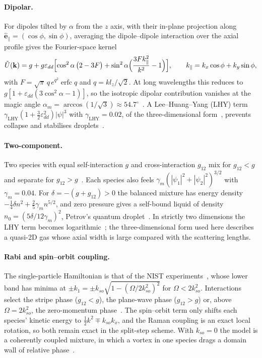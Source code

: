 \documentclass[11pt,a4paper]{article}
\begin{document}
\paragraph{Dipolar.} For dipoles tilted by $\alpha$ from the $z$ axis, with their in-plane projection along $\hat{\mathbf e}_\parallel=(\cos\phi,\sin\phi)$, averaging the dipole--dipole interaction over the axial profile gives the Fourier-space kernel~\cite{fischer,ticknor}
\begin{equation}
\tilde U(\mathbf k) = g + g\varepsilon_{dd}\Bigl[\cos^2\alpha\,\bigl(2-3F\bigr) + \sin^2\alpha\Bigl(\frac{3Fk_\parallel^2}{k^2}-1\Bigr)\Bigr],\qquad k_\parallel=k_x\cos\phi+k_y\sin\phi,
\end{equation}
with $F=\sqrt\pi\,q\,e^{q^2}\operatorname{erfc}q$ and $q=kl_z/\sqrt2$. At long wavelengths this reduces to $g[1+\varepsilon_{dd}(3\cos^2\alpha-1)]$, so the isotropic dipolar contribution vanishes at the magic angle $\alpha_m=\arccos(1/\sqrt3)\approx54.7^\circ$~\cite{giovanazzi}. A Lee--Huang--Yang (LHY) term $\gamma_{\mathrm{LHY}}(1+\tfrac32\varepsilon_{dd}^2)|\psi|^3$ with $\gamma_{\mathrm{LHY}}=0.02$, of the three-dimensional form~\cite{schuetzhold,limapelster}, prevents collapse and stabilises droplets~\cite{kadau,chomaz}.

\paragraph{Two-component.} Two species with equal self-interaction $g$ and cross-interaction $g_{12}$ mix for $g_{12}<g$ and separate for $g_{12}>g$~\cite{aochui}. Each species also feels $\gamma_m(|\psi_1|^2+|\psi_2|^2)^{3/2}$ with $\gamma_m=0.04$. For $\delta=-(g+g_{12})>0$ the balanced mixture has energy density $-\tfrac14\delta n^2+\tfrac25\gamma_m n^{5/2}$, and zero pressure gives a self-bound liquid of density $n_0=(5\delta/12\gamma_m)^2$, Petrov's quantum droplet~\cite{petrov,cabrera,semeghini}. In strictly two dimensions the LHY term becomes logarithmic~\cite{petrovastrakharchik}; the three-dimensional form used here describes a quasi-2D gas whose axial width is large compared with the scattering lengths.

\paragraph{Rabi and spin--orbit coupling.} The single-particle Hamiltonian is that of the NIST experiments~\cite{lin}, whose lower band has minima at $\pm k_1=\pm k_{so}\sqrt{1-(\Omega/2k_{so}^2)^2}$ for $\Omega<2k_{so}^2$. Interactions select the stripe phase ($g_{12}<g$), the plane-wave phase ($g_{12}>g$) or, above $\Omega=2k_{so}^2$, the zero-momentum phase~\cite{hozhang,lipitaevskiistringari}. The spin--orbit term only shifts each species' kinetic energy to $\tfrac12k^2\mp k_{so}k_x$, and the Raman coupling is an exact local rotation, so both remain exact in the split-step scheme. With $k_{so}=0$ the model is a coherently coupled mixture, in which a vortex in one species drags a domain wall of relative phase~\cite{sonstephanov}.
\end{document}
